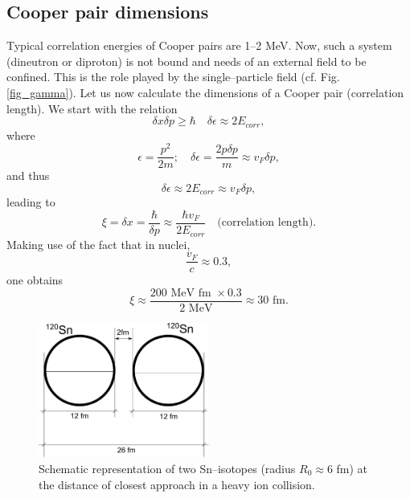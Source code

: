 \subsection{Cooper pair dimensions}
Typical correlation energies of Cooper pairs are 1--2 MeV. Now, such a system (dineutron or diproton) is not bound and needs of an external field to be confined. This is the role played by the single--particle field (cf. Fig. \ref{fig_gamma}). Let us now calculate the dimensions of a Cooper pair (correlation length). We start with the relation 
\begin{equation}
\delta x\delta p\ge \hbar\quad \delta\epsilon\approx 2E_{corr},
\end{equation}
where
\begin{equation}
\epsilon=\frac{p^2}{2m};\quad\delta\epsilon=\frac{2p\delta p}{m}\approx v_F\delta p,
\end{equation}
and thus 
\begin{equation}
\delta\epsilon\approx 2 E_{corr}\approx v_F\delta p,
\end{equation}
leading to
\begin{equation}
\xi=\delta x=\frac{\hbar}{\delta p}\approx \frac{\hbar v_F}{2 E_{corr}}\quad \text{(correlation length)}.
\end{equation}
Making use of the fact that in nuclei,
\begin{equation}
\frac{v_F}{c}\approx 0.3,
\end{equation}
one obtains
\begin{equation}
\xi\approx \frac{200\text{ MeV fm }\times 0.3}{2 \text{ MeV}}\approx 30 \text{ fm}.
\end{equation}
\begin{figure}
\centerline{\includegraphics*[width=0.5\textwidth,angle=0]{nutshell/figs/fig_1.pdf}}
\caption{Schematic representation of two Sn--isotopes (radius $R_0\approx 6$ fm) at the distance of closest approach in a heavy ion collision.}\label{fig_1}
\end{figure}


